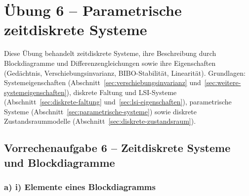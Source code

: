 \section{Übung 6 – Parametrische zeitdiskrete Systeme}

Diese Übung behandelt zeitdiskrete Systeme, ihre Beschreibung durch
Blockdiagramme und Differenzengleichungen sowie ihre Eigenschaften
(Gedächtnis, Verschiebungsinvarianz, BIBO-Stabilität, Linearität).
Grundlagen: Systemeigenschaften (Abschnitt~\ref{sec:verschiebungsinvarianz}
und~\ref{sec:weitere-systemeigenschaften}), diskrete Faltung und
LSI-Systeme (Abschnitt~\ref{sec:diskrete-faltung}
und~\ref{sec:lsi-eigenschaften}), parametrische Systeme
(Abschnitt~\ref{sec:parametrische-systeme}) sowie diskrete
Zustandsraummodelle (Abschnitt~\ref{sec:diskrete-zustandsraum}).


\subsection*{Vorrechenaufgabe 6 – Zeitdiskrete Systeme und Blockdiagramme}

\subsubsection*{a) i) Elemente eines Blockdiagramms}

